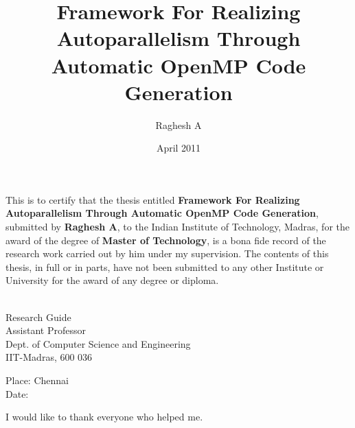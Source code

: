 \documentclass[MTech]{iitmdiss}
\def\thesistitle{Framework For Realizing Autoparallelism Through Automatic OpenMP Code Generation}
\def\thesisauthor{Raghesh A}
\begin{document}


\title{\thesistitle}

\author{\thesisauthor}

\date{April 2011}

\begin{singlespace}
\maketitle 
\end{singlespace} 



\certificate

\vspace*{0.5in}

\noindent This is to certify that the thesis entitled {\bf {\thesistitle}}, 
submitted by {\bf {\thesisauthor}}, to the Indian Institute of Technology, 
Madras, for the award of the degree of {\bf Master of Technology}, 
is a bona fide record of the research work carried out by him under my
supervision. The contents of this thesis, in full or in parts, have not been
submitted to any other Institute or University for the award of any degree or
diploma.

\vspace*{1.4in}
\hspace*{-0.25in}
\begin{singlespace}
 \\
\noindent Research Guide \\ 
\noindent Assistant Professor \\
\noindent Dept. of Computer Science and Engineering\\
\noindent IIT-Madras, 600 036 \\
\end{singlespace}
\vspace*{0.20in}
\noindent Place: Chennai\\ 
Date:

\acknowledgements

I would like to thank everyone who helped me.

\end{document}

